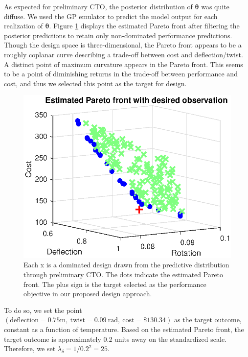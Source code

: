 \documentclass[12pt]{article}
\begin{document}
%
As expected for preliminary CTO, the posterior distribution of $\boldsymbol\theta$ was quite diffuse.
%
We used the GP emulator to predict the model output for each realization of $\boldsymbol \theta$.
%
Figure \ref{fig:elbow} displays the estimated Pareto front after filtering the posterior predictions to retain only non-dominated performance predictions.
%
Though the design space is three-dimensional, the Pareto front appears to be a roughly coplanar curve describing a trade-off between cost and deflection/twist.
%
A distinct point of maximum curvature appears in the Pareto front. 
%
This seems to be a point of diminishing returns in the trade-off between performance and cost, and thus we selected this point as the target for design.
%
\begin{figure}
\centering
\includegraphics[scale=0.8]{FIG_est_PF_with_des_obs.eps}
\caption{Each x is a dominated design drawn from the predictive distribution through preliminary CTO. The dots indicate the estimated Pareto front. The plus sign is the target selected as the performance objective in our proposed design approach.}
\label{fig:elbow}
\end{figure}
%
To do so, we set the point $(\mathrm{deflection}=0.75\mathrm m,\ 
\mathrm{twist}=0.09\ \mathrm{rad},\ 
\mathrm{cost}=\$130.34)$
 as the target outcome, constant as a function of temperature.
%
Based on the estimated Pareto front, the target outcome is approximately 0.2 units away on the standardized scale.
%
Therefore, we set $\lambda_\delta=1/0.2^2=25.$
%
\end{document}
